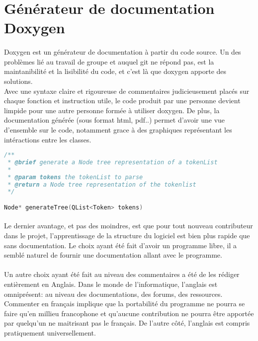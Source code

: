     \newpage

    \section{Générateur de documentation Doxygen}
        \paragraph{}
            Doxygen est un générateur de documentation à partir du code source. Un des problèmes lié au travail de groupe et auquel git ne répond pas, est la maintanibilité et la lisibilité du code, et c'est là que doxygen apporte des solutions.
            \\ Avec une syntaxe claire et rigoureuse de commentaires judicieusement placés sur chaque fonction et instruction utile, le code produit par une personne devient limpide pour une autre personne formée à utiliser doxygen. De plus, la documentation générée (sous format html, pdf..) permet d'avoir une vue d'ensemble sur le code, notamment grace à des graphiques représentant les intéractions entre les classes.

        \begin{lstlisting}[frame=single, language=C++, caption=Exemple de  commentaire utilisant la syntaxe de doxygen] 
/**
 * @brief generate a Node tree representation of a tokenList
 *
 * @param tokens the tokenList to parse
 * @return a Node tree representation of the tokenlist
 */

Node* generateTree(QList<Token> tokens)
        \end{lstlisting}


        \paragraph{}
            Le dernier avantage, et pas des moindres, est que pour tout nouveau contributeur dans le projet, l'apprentissage de la structure du logiciel est bien plus rapide que sans documentation. Le choix ayant été fait d'avoir un programme libre, il a semblé naturel de fournir une documentation allant avec le programme.
            
        \paragraph{}
            Un autre choix ayant été fait au niveau des commentaires a été de les rédiger entièrement en Anglais. Dans le monde de l'informatique, l'anglais est omniprésent: au niveau des documentations, des forums, des ressources. Commenter en français implique que la portabilité du programme ne pourra se faire qu'en millieu francophone et qu'aucune contribution ne pourra être apportée par quelqu'un ne maitrisant pas le français. De l'autre côté, l'anglais est compris pratiquement universellement. 
        

